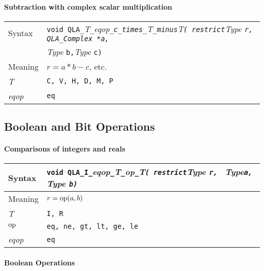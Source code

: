 \documentclass{article}
\newcommand{\op}{\mathop{\rm op}}
\newcommand{\tqlaComplex}{QLA\ttdash Complex }
\newcommand{\namespace}{QLA}
\newcommand{\ttdash}{{\tt \_}}
\newcommand{\itt}{\it T}
\newcommand{\extraarg}{}
\begin{document}
\paragraph{Subtraction with complex scalar multiplication}

\begin{flushleft}
  \begin{tabular}{|l|l|}
  \hline
  Syntax      & {\tt void \namespace}\ttdash\itt\ttdash{\it eqop}\ttdash{\tt c}\ttdash{\tt times}\ttdash\itt\ttdash{\tt minus}\itt{\tt ( restrict}{\it Type }{\tt *r, }{\tt \tqlaComplex *a, }\\
              & {\it Type }{\tt *b,}{\it Type }{\tt *c\extraarg)} \\
  \hline
  Meaning     & $r = a * b - c$, etc. \\
  \hline
  \itt        & {\tt C, V, H, D, M, P} \\
  \hline
  {\it eqop}  & {\tt eq} \\
  \hline
  \end{tabular}
\end{flushleft}

\subsection{Boolean and Bit Operations}
\paragraph{Comparisons of integers and reals}

\begin{flushleft}
  \begin{tabular}{|l|l|}
  \hline
  Syntax      & {\tt void \namespace}\ttdash{\tt I}\ttdash{\it eqop}\ttdash\itt\ttdash{\it op}\ttdash\itt{\tt ( restrict}{\it Type }{\tt *r, } {\it Type}{\tt *a, }{\it Type }{\tt *b\extraarg)} \\
  \hline
  Meaning     & $r = \op(a,b)$ \\
  \hline
  \itt        & {\tt I, R} \\
  \hline
  $\op$       & {\tt eq, ne, gt, lt, ge, le} \\
  \hline
  {\it eqop}  & {\tt eq} \\
  \hline
  \end{tabular}
\end{flushleft}

\paragraph{Boolean Operations}
\end{document}
